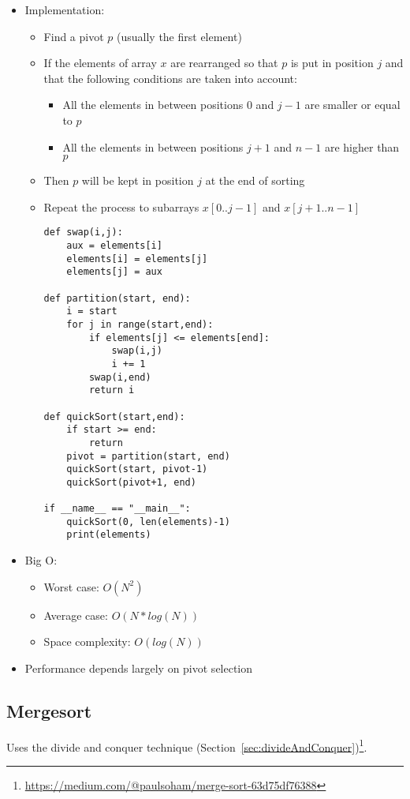 \documentclass[a4paper, 11.25pt]{article}
\begin{document}
\begin{itemize}
\item Implementation:
    \begin{itemize}
        \item Find a pivot $p$ (usually the first element)
        \item If the elements of array $x$ are rearranged so that $p$ is put in position $j$ and that the following conditions are taken into account:
        \begin{itemize}
            \item All the elements in between positions $0$ and $j-1$ are smaller or equal to $p$
            \item All the elements in between positions $j+1$ and $n-1$ are higher than $p$
        \end{itemize}
        \item Then $p$ will be kept in position $j$ at the end of sorting
        \item Repeat the process to subarrays $x[0..j-1]$ and $x[j+1..n-1]$
        \begin{lstlisting}[style=PythonStyle]
def swap(i,j):
    aux = elements[i]
    elements[i] = elements[j]
    elements[j] = aux
    
def partition(start, end):
    i = start
    for j in range(start,end):
        if elements[j] <= elements[end]:
            swap(i,j)
            i += 1
        swap(i,end)
        return i

def quickSort(start,end):
    if start >= end:
        return
    pivot = partition(start, end)
    quickSort(start, pivot-1)
    quickSort(pivot+1, end)

if __name__ == "__main__":
    quickSort(0, len(elements)-1)
    print(elements)\end{lstlisting}  
    \end{itemize}
\item Big O:
    \begin{itemize}
        \item Worst case: $O(N^{2})$
        \item Average case: $O(N*log(N))$
        \item Space complexity: $O(log(N))$
    \end{itemize}
\item Performance depends largely on pivot selection
\end{itemize}

\subsection{Mergesort}
Uses the divide and conquer technique (Section~\ref{sec:divideAndConquer})\footnote{\url{https://medium.com/@paulsoham/merge-sort-63d75df76388}}.
\end{document}
